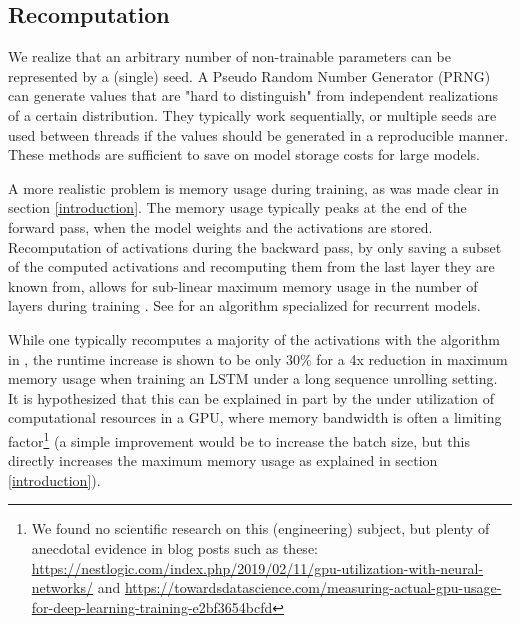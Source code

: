 \documentclass[]{article}
\begin{document}
\begin{multicols}{2}
	\section{Recomputation}\label{recomputation}
	We realize that an arbitrary number of non-trainable parameters can be represented by a (single) seed. A Pseudo Random Number Generator (PRNG) can generate values that are "hard to distinguish" from independent realizations of a certain distribution. They typically work sequentially, or multiple seeds are used between threads if the values should be generated in a reproducible manner. These methods are sufficient to save on model storage costs for large models.
	
	A more realistic problem is memory usage during training, as was made clear in section \ref{introduction}. The memory usage typically peaks at the end of the forward pass, when the model weights and the activations are stored. Recomputation of activations during the backward pass, by only saving a subset of the computed activations and recomputing them from the last layer they are known from, allows for sub-linear maximum memory usage in the number of layers during training \cite{chen2016training}. See \cite{DBLP:journals/corr/GruslysMDLG16} for an algorithm specialized for recurrent models.
	
	While one typically recomputes a majority of the activations with the algorithm in \cite{chen2016training}, the runtime increase is shown to be only 30\% for a 4x reduction in maximum memory usage when training an LSTM under a long sequence unrolling setting. It is hypothesized that this can be explained in part by the under utilization of computational resources in a GPU, where memory bandwidth is often a limiting factor\footnote{We found no scientific research on this (engineering) subject, but plenty of anecdotal evidence in blog posts such as these: \url{https://nestlogic.com/index.php/2019/02/11/gpu-utilization-with-neural-networks/} and  \url{https://towardsdatascience.com/measuring-actual-gpu-usage-for-deep-learning-training-e2bf3654bcfd}} (a simple improvement would be to increase the batch size, but this directly increases the maximum memory usage as explained in section \ref{introduction}).
	

\end{multicols}
\end{document}
